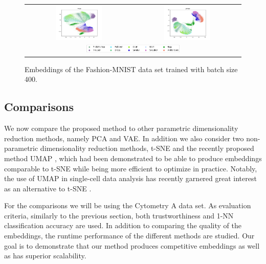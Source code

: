 \begin{figure}[!htb]
  \centering
  \begin{tabular}{cc}
    \includegraphics[width=0.45\textwidth]{images/fashion_mnist_ptsne_embedding.png} &
    \includegraphics[width=0.45\textwidth]{images/fashion_mnist_vptsne_embedding.png} \\
    \multicolumn{2}{c}{\includegraphics[width=0.45\textwidth]{images/fashion_mnist_legend.png}}
  \end{tabular}
  \caption{Embeddings of the Fashion-MNIST data set trained with batch size 400.}
  \label{fig:fashion_mnist_comparison}
\end{figure}

\subsection{Comparisons}
\label{section:comparisons}

We now compare the proposed method to other parametric dimensionality reduction methods, namely PCA and VAE. In addition we also consider two non-parametric dimensionality reduction methods, t-SNE and the recently proposed method UMAP \cite{umap}, which had been demonstrated to be able to produce embeddings comparable to t-SNE while being more efficient to optimize in practice. Notably, the use of UMAP in single-cell data analysis has recently garnered great interest as an alternative to t-SNE \cite{umap_single_cell}.

For the comparisons we will be using the Cytometry A data set. As evaluation criteria, similarly to the previous section, both trustworthiness and 1-NN classification accuracy are used. In addition to comparing the quality of the embeddings, the runtime performance of the different methods are studied. Our goal is to demonstrate that our method produces competitive embeddings as well as has superior scalability.


